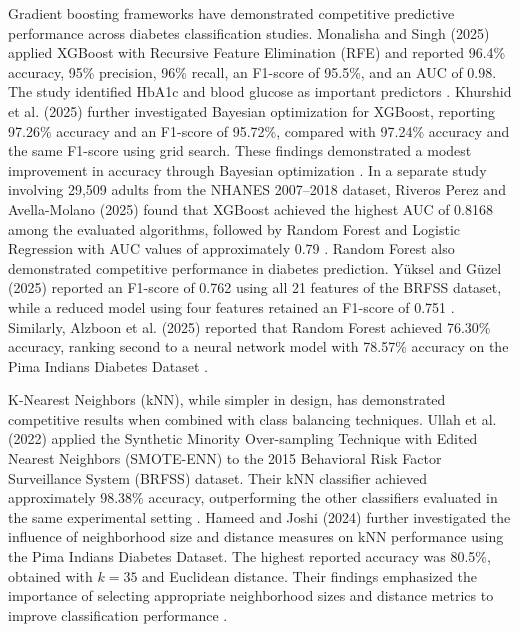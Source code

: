 Gradient boosting frameworks have demonstrated competitive predictive performance across diabetes classification studies. Monalisha and Singh (2025) applied XGBoost with Recursive Feature Elimination (RFE) and reported 96.4\% accuracy, 95\% precision, 96\% recall, an F1-score of 95.5\%, and an AUC of 0.98. The study identified HbA1c and blood glucose as important predictors \cite{monalisha_xgboost_2025}. Khurshid et al. (2025) further investigated Bayesian optimization for XGBoost, reporting 97.26\% accuracy and an F1-score of 95.72\%, compared with 97.24\% accuracy and the same F1-score using grid search. These findings demonstrated a modest improvement in accuracy through Bayesian optimization \cite{khurshid_xgboost_2025}. In a separate study involving 29,509 adults from the NHANES 2007--2018 dataset, Riveros Perez and Avella-Molano (2025) found that XGBoost achieved the highest AUC of 0.8168 among the evaluated algorithms, followed by Random Forest and Logistic Regression with AUC values of approximately 0.79 \cite{riveros_perez_diabetes_2025}. Random Forest also demonstrated competitive performance in diabetes prediction. Y\"uksel and G\"uzel (2025) reported an F1-score of 0.762 using all 21 features of the BRFSS dataset, while a reduced model using four features retained an F1-score of 0.751 \cite{yuksel_guzel_rf_2025}. Similarly, Alzboon et al. (2025) reported that Random Forest achieved 76.30\% accuracy, ranking second to a neural network model with 78.57\% accuracy on the Pima Indians Diabetes Dataset \cite{alzboon_diabetes_2025}.

K-Nearest Neighbors (kNN), while simpler in design, has demonstrated competitive results when combined with class balancing techniques. Ullah et al. (2022) applied the Synthetic Minority Over-sampling Technique with Edited Nearest Neighbors (SMOTE-ENN) to the 2015 Behavioral Risk Factor Surveillance System (BRFSS) dataset. Their kNN classifier achieved approximately 98.38\% accuracy, outperforming the other classifiers evaluated in the same experimental setting \cite{ullah_diabetes_2022}. Hameed and Joshi (2024) further investigated the influence of neighborhood size and distance measures on kNN performance using the Pima Indians Diabetes Dataset. The highest reported accuracy was 80.5\%, obtained with $k=35$ and Euclidean distance. Their findings emphasized the importance of selecting appropriate neighborhood sizes and distance metrics to improve classification performance \cite{hameed_joshi_knn_2024}.

